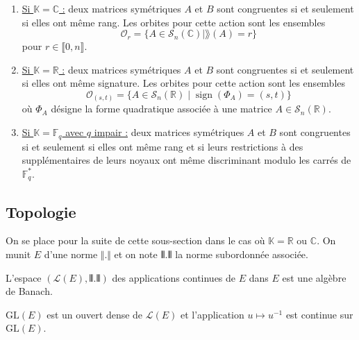   \begin{theorem}
    \begin{enumerate}[label={\bfseries(\roman*)}]
      \item \uline{Si $\mathbb{K} = \mathbb{C}$ :} deux matrices symétriques $A$ et $B$ sont congruentes si et seulement si elles ont même rang. Les orbites pour cette action sont les ensembles
      \[ \mathcal{O}_r = \{ A \in \mathcal{S}_n(\mathbb{C}) \mid \rang(A) = r \} \]
      pour $r \in \llbracket 0, n \rrbracket$.
      \item \uline{Si $\mathbb{K} = \mathbb{R}$ :} deux matrices symétriques $A$ et $B$ sont congruentes si et seulement si elles ont même signature. Les orbites pour cette action sont les ensembles
      \[ \mathcal{O}_{(s,t)} = \{ A \in \mathcal{S}_n(\mathbb{R}) \mid \operatorname{sign}(\Phi_A) = (s,t) \} \]
      où $\Phi_A$ désigne la forme quadratique associée à une matrice $A \in \mathcal{S}_n(\mathbb{R})$.
      \item \uline{Si $\mathbb{K} = \mathbb{F}_q$ avec $q$ impair :} deux matrices symétriques $A$ et $B$ sont congruentes si et seulement si elles ont même rang et si leurs restrictions à des supplémentaires de leurs noyaux ont même discriminant modulo les carrés de $\mathbb{F}_q^*$.
    \end{enumerate}
  \end{theorem}

  \subsection{Topologie}


  On se place pour la suite de cette sous-section dans le cas où $\mathbb{K} = \mathbb{R}$ ou $\mathbb{C}$. On munit $E$ d'une norme $\Vert . \Vert$ et on note $\VERT . \VERT$ la norme subordonnée associée.

  \begin{proposition}
    L'espace $(\mathcal{L}(E), \VERT . \VERT)$ des applications continues de $E$ dans $E$ est une algèbre de Banach.
  \end{proposition}

  \begin{theorem}
    $\mathrm{GL}(E)$ est un ouvert dense de $\mathcal{L}(E)$ et l'application $u \mapsto u^{-1}$ est continue sur $\mathrm{GL}(E)$.
  \end{theorem}



